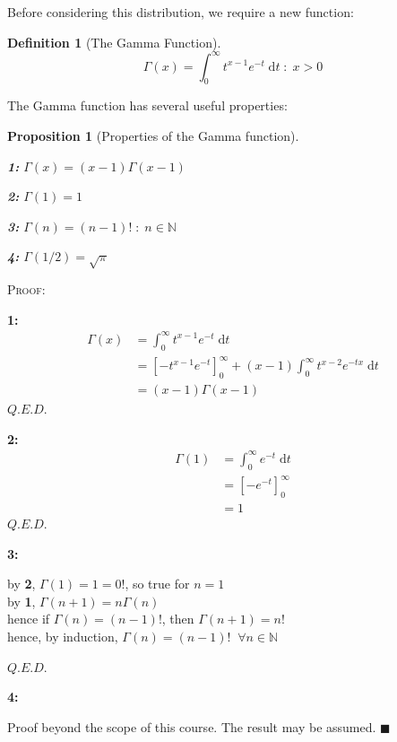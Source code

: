 \documentclass[12pt,a4paper]{article}
\newtheorem{defn}[thm]{Definition}
\newtheorem{prop}[thm]{Proposition}
\begin{document}
Before considering this distribution, we require a new function:

\begin{defn}[The Gamma Function]
$$\Gamma(x) = \int_0^{\infty}\!\!t^{x-1}e^{-t}\;\mathrm{d}t \; : \; x>0$$
\end{defn}

\noindent The Gamma function has several useful properties:

\begin{prop}[Properties of the Gamma function]$\quad$\par
\textbf{1:}  $\Gamma(x) = (x-1)\Gamma(x-1)$\par
\textbf{2:} $\Gamma(1) = 1$\par
\textbf{3:} $\Gamma(n) = (n-1)! \; : \; n \in \mathbb{N}$\par
\textbf{4:} $\Gamma(1/2) = \sqrt \pi$\par
\end{prop}

\noindent\textsc{Proof:}\par
\textbf{1:}
\begin{align*}
\Gamma(x) &= \int_0^\infty \!\! t^{x-1}e^{-t}\;\mathrm{d}t\\
&=\left[ -t^{x-1}e^{-t}\right]_0^\infty + (x-1)\int_0^\infty\!\! t^{x-2}e^{-tx}\;\mathrm{d}t\\
&= (x-1)\Gamma(x-1)
\end{align*}
\hfill$Q.E.D.$

\noindent \textbf{2:}
\begin{align*}
\Gamma(1) &= \int_0^\infty \!\! e^{-t}\;\mathrm{d}t\\
&= \left[-e^{-t}\right]_0^\infty\\
&= 1
\end{align*}
\hfill$Q.E.D.$

\noindent \textbf{3:}
\begin{center}
by \textbf{2}, $\Gamma(1) = 1 = 0!$, so true for $n=1$\\
by \textbf{1}, $\Gamma(n+1) = n\Gamma(n)$\\
hence if $\Gamma(n)=(n-1)!$, then $\Gamma(n+1) = n!$\\
hence, by induction, $\Gamma(n) = (n-1)! \;\; \forall n \in \mathbb{N}$
\end{center}
\hfill$Q.E.D.$

\noindent \textbf{4:}\par
\indent Proof beyond the scope of this course. The result may be assumed.
\hfill $\blacksquare$\par
\vspace{1cm}
\end{document}
